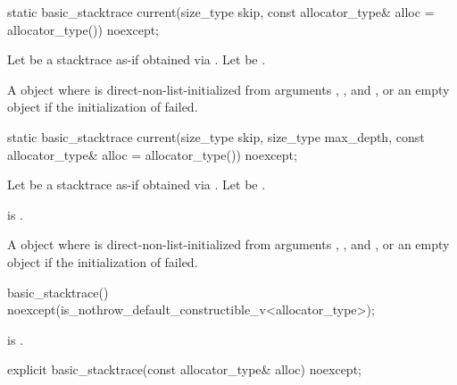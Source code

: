 %
\begin{itemdecl}
static basic_stacktrace current(size_type skip,
                                const allocator_type& alloc = allocator_type()) noexcept;
\end{itemdecl}

\begin{itemdescr}
\pnum
Let  be a stacktrace
as-if obtained via .
Let  be .

\pnum
\returns
A  object
where  is direct-non-list-initialized from arguments
, , and ,
or an empty  object
if the initialization of  failed.
\end{itemdescr}

%
\begin{itemdecl}
static basic_stacktrace current(size_type skip, size_type max_depth,
                                const allocator_type& alloc = allocator_type()) noexcept;
\end{itemdecl}

\begin{itemdescr}
\pnum
Let  be a stacktrace
as-if obtained via .
Let  be .

\pnum
\hardexpects
{} is .

\pnum
\returns
A  object
where  is direct-non-list-initialized from arguments
, ,
and ,
or an empty  object
if the initialization of  failed.
\end{itemdescr}

%
\begin{itemdecl}
basic_stacktrace() noexcept(is_nothrow_default_constructible_v<allocator_type>);
\end{itemdecl}

\begin{itemdescr}
\pnum
\ensures
{} is .
\end{itemdescr}

%
\begin{itemdecl}
explicit basic_stacktrace(const allocator_type& alloc) noexcept;
\end{itemdecl}

